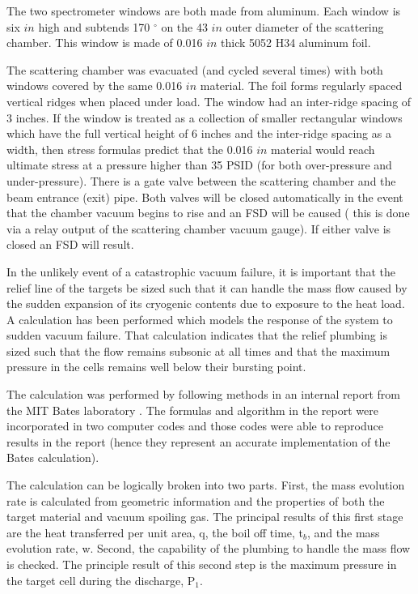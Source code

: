 {\begin{safetyen}{10}{5}
The two spectrometer windows are both made from aluminum. Each window
is six $in$ high and subtends 170 $^\circ$ on the 43 $in$ outer
diameter of the scattering chamber. This window is made of
0.016 $in$ thick 5052 H34 aluminum foil.

The scattering chamber was evacuated (and cycled several times)
with both windows covered by the same 0.016 $in$ material. 
The foil forms regularly spaced vertical ridges when
placed under load. The window had an inter-ridge
spacing of 3 inches.
If the window is treated as a collection
of smaller rectangular windows which have the full vertical height
of 6 inches and the inter-ridge spacing as a width,
then stress formulas predict that the 0.016 $in$
material would reach ultimate stress at a pressure higher than 35 PSID
(for both over-pressure and under-pressure). 
There is a gate valve between the 
scattering chamber and the beam entrance (exit) 
pipe. Both 
valves will be closed automatically in the
event that the chamber vacuum begins to rise and an FSD will be caused
( this is done via a relay output of the scattering
chamber vacuum gauge). If either valve is closed an FSD will result.

In the unlikely event of a catastrophic vacuum failure, it
is important that the relief line of the targets be sized
such that it can handle the mass flow caused by the sudden
expansion of its cryogenic contents due to exposure to the
heat load. A calculation has been performed which
models the response of the system to sudden vacuum failure.
That calculation indicates that the relief plumbing is sized such that the
flow remains subsonic at all times and that the maximum pressure
in the cells remains well below their bursting point.

\end{safetyen}

The calculation was performed  by following methods in 
an internal report from the MIT Bates
laboratory \cite{bi:bates}. The formulas and algorithm in the report were
incorporated in two computer codes and those codes were able to reproduce
results in the report (hence they represent an accurate implementation
of the Bates calculation).

The calculation can be logically broken into two parts. First,
the mass evolution rate is calculated from geometric information
and the properties of both the target material and vacuum spoiling gas.
The principal results of this first stage are the heat transferred
per unit area, q, the boil off time, t$_b$, and the mass evolution rate, w.
Second, the capability of the plumbing to handle the mass flow
is checked. The principle result of this second step is the
maximum pressure in the target cell during the discharge, P$_1$.

}
